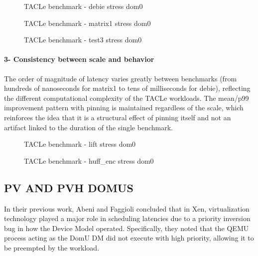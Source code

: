 \begin{figure}
\centering

\caption{TACLe benchmark - debie stress dom0}
\end{figure}

\begin{figure}
\centering

\caption{TACLe benchmark - matrix1 stress dom0}
\end{figure}

\begin{figure}
\centering

\caption{TACLe benchmark - test3 stress dom0}
\end{figure}

\paragraph{3- Consistency between scale and
behavior}\label{consistency-between-scale-and-behavior}

The order of magnitude of latency varies greatly between benchmarks
(from hundreds of nanoseconds for matrix1 to tens of milliseconds for
debie), reflecting the different computational complexity of the TACLe
workloads. The mean/p99 improvement pattern with pinning is maintained
regardless of the scale, which reinforces the idea that it is a
structural effect of pinning itself and not an artifact linked to the
duration of the single benchmark.

\begin{figure}
\centering

\caption{TACLe benchmark - lift stress dom0}
\end{figure}

\begin{figure}
\centering

\caption{TACLe benchmark - huff\_enc stress dom0}
\end{figure}

\subsection{PV AND PVH DOMUS}\label{pv-and-pvh-domus-1}

In their previous work, Abeni and Faggioli concluded that in Xen,
virtualization technology played a major role in scheduling latencies
due to a priority inversion bug in how the Device Model operated.
Specifically, they noted that the QEMU process acting as the DomU DM did
not execute with high priority, allowing it to be preempted by the
workload.


